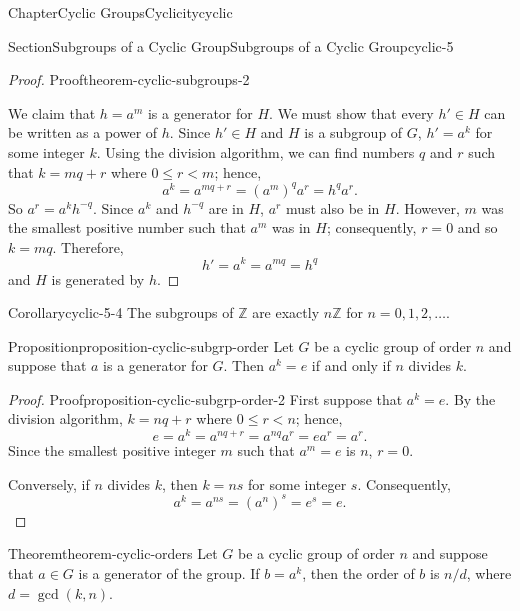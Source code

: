 \documentclass[oneside,10pt,]{book}
\numberwithin{equation}{section}
\newcommand{\lt}{<}
\begin{document}
\begin{chapterptx}{Chapter}{Cyclic Groups}{}{Cyclicity}{}{}{cyclic}
\begin{sectionptx}{Section}{Subgroups of a Cyclic Group}{}{Subgroups of a Cyclic Group}{}{}{cyclic-5}
\begin{proof}{Proof}{}{theorem-cyclic-subgroups-2}
\par
We claim that \(h = a^m\) is a generator for \(H\).  We must show that every \(h' \in H\) can be written as a power of \(h\). Since \(h' \in H\) and \(H\) is a subgroup of \(G\), \(h' = a^k\) for some integer \(k\). Using the division algorithm, we can find numbers \(q\) and \(r\) such that \(k = mq +r\) where \(0 \leq r \lt m\); hence,%
\begin{equation*}
a^k = a^{mq +r} = (a^m)^q a^r = h^q a^r\text{.}
\end{equation*}
So \(a^r = a^k h^{-q}\). Since \(a^k\) and \(h^{-q}\) are in \(H\), \(a^r\) must also be in \(H\).  However, \(m\) was the smallest positive number such that \(a^m\) was in \(H\); consequently, \(r=0\) and so \(k=mq\). Therefore,%
\begin{equation*}
h' = a^k = a^{mq} =  h^q
\end{equation*}
and \(H\) is generated by \(h\).%
\end{proof}
\begin{corollary}{Corollary}{}{}{cyclic-5-4}%
The subgroups of \({\mathbb Z}\) are exactly \(n{\mathbb Z}\) for \(n = 0, 1, 2,\ldots\).%
\end{corollary}
\begin{proposition}{Proposition}{}{}{proposition-cyclic-subgrp-order}%
Let \(G\) be a cyclic group of order \(n\) and suppose that \(a\) is a generator for  \(G\). Then \(a^k=e\) if and only if \(n\) divides \(k\).%
\end{proposition}
\begin{proof}{Proof}{}{proposition-cyclic-subgrp-order-2}
First suppose that \(a^k=e\). By the division algorithm, \(k = nq + r\) where \(0 \leq r \lt n\); hence,%
\begin{equation*}
e = a^k = a^{nq + r} = a^{nq} a^r = e a^r = a^r\text{.}
\end{equation*}
Since the smallest positive integer \(m\) such that \(a^m = e\) is \(n\), \(r= 0\).%
\par
Conversely, if \(n\) divides \(k\), then \(k=ns\) for some integer \(s\). Consequently,%
\begin{equation*}
a^k = a^{ns} = (a^n)^s = e^s = e\text{.}
\end{equation*}
%
\end{proof}
\begin{theorem}{Theorem}{}{}{theorem-cyclic-orders}%
Let \(G\) be a cyclic group of order \(n\) and suppose that \(a \in G\) is a generator of the group.  If \(b = a^k\), then the order of \(b\) is \(n/d\), where \(d = \gcd(k,n)\).%

\end{theorem}
\end{sectionptx}
\end{chapterptx}
\end{document}
